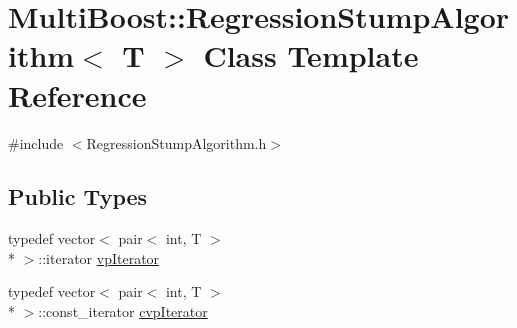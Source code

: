 \hypertarget{classMultiBoost_1_1RegressionStumpAlgorithm}{\section{Multi\-Boost\-:\-:Regression\-Stump\-Algorithm$<$ T $>$ Class Template Reference}
\label{classMultiBoost_1_1RegressionStumpAlgorithm}
}


{\ttfamily \#include $<$Regression\-Stump\-Algorithm.\-h$>$}

\subsection*{Public Types}
\begin{DoxyCompactItemize}
\item 
typedef vector$<$ pair$<$ int, T $>$\\*
 $>$\-::iterator \hyperlink{classMultiBoost_1_1RegressionStumpAlgorithm_a2b15b3238653298e01264e1d90f2ec0f}{vp\-Iterator}
\item 
typedef vector$<$ pair$<$ int, T $>$\\*
 $>$\-::const\-\_\-iterator \hyperlink{classMultiBoost_1_1RegressionStumpAlgorithm_a08d7e7996cf0dfa4011419b3529d7014}{cvp\-Iterator}
\end{DoxyCompactItemize}
